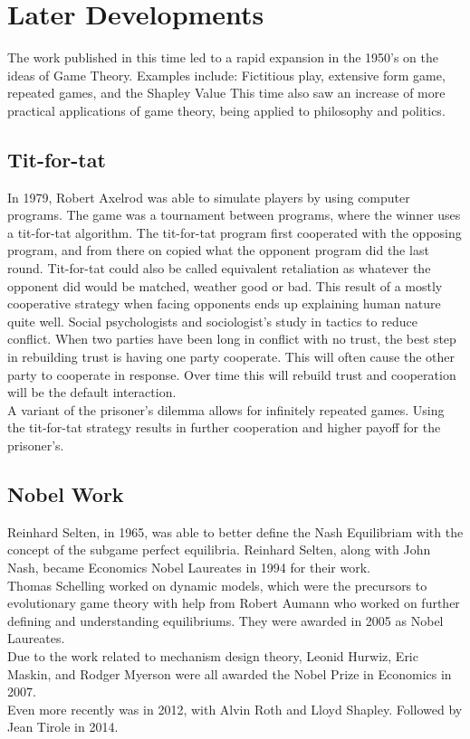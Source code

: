 \documentclass[12pt]{article}
\begin{document}
 	\section{Later Developments}
 	The work published in this time led to a rapid expansion in the 1950's on the ideas of Game Theory. Examples include: Fictitious play, extensive form game, repeated games, and the Shapley Value  This time also saw an increase of more practical applications of game theory, being applied to philosophy and politics.
 	\subsection{Tit-for-tat}
 	 In 1979, Robert Axelrod was able to simulate players by using computer programs. The game was a tournament between programs, where the winner uses a tit-for-tat algorithm. The tit-for-tat program first cooperated with the opposing program, and from there on copied what the opponent program did the last round. Tit-for-tat could also be called equivalent retaliation as whatever the opponent did would be matched, weather good or bad. This result of a mostly cooperative strategy when facing opponents ends up explaining human nature quite well. Social psychologists and sociologist's study in tactics to reduce conflict. When two parties have been long in conflict with no trust, the best step in rebuilding trust is having one party cooperate. This will often cause the other party to cooperate in response. Over time this will rebuild trust and cooperation will be the default interaction. \\
 	 A variant of the prisoner's dilemma allows for infinitely repeated games. Using the tit-for-tat strategy results in further cooperation and higher payoff for the prisoner's. 
 	 \subsection{Nobel Work}
 	 Reinhard Selten, in 1965, was able to better define the Nash Equilibriam with the concept of the subgame perfect equilibria. Reinhard Selten, along with John Nash, became Economics Nobel Laureates in 1994 for their work.\\
 	 Thomas Schelling worked on dynamic models, which were the precursors to evolutionary game theory with help from Robert Aumann who worked on further defining and understanding equilibriums. They were awarded in 2005 as Nobel Laureates.\\
 	 Due to the work related to mechanism design theory, Leonid Hurwiz, Eric Maskin, and Rodger Myerson were all awarded the Nobel Prize in Economics in 2007.\\
 	 Even more recently was in 2012, with Alvin Roth and Lloyd Shapley. Followed by Jean Tirole in 2014.
\end{document}
